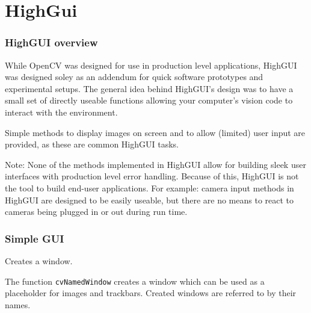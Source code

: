 \chapter{HighGui}

\subsection{HighGUI overview}

While OpenCV was designed for use in production level
applications, HighGUI was designed soley as an addendum for quick software prototypes
and experimental setups. The general idea behind HighGUI's design was to
have a small set of directly useable functions allowing your computer's
vision code to interact with the environment.

Simple methods to display
images on screen and to allow (limited) user input are provided, as these are common 
HighGUI tasks.

Note: None of the methods implemented in HighGUI allow for building
sleek user interfaces with production level error handling. Because of
this, HighGUI is not the tool to build end-user applications. For
example: camera input methods in HighGUI are designed to be easily
useable, but there are no means to react to cameras being plugged
in or out during run time.

\subsection{Simple GUI}


Creates a window.


\begin{description}
\end{description}

The function \texttt{cvNamedWindow} creates a window which can be used as a placeholder for images and trackbars. Created windows are referred to by their names.

